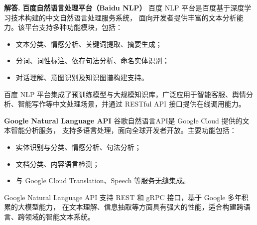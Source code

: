 \documentclass[12pt, a4paper, oneside]{ctexart}
\numberwithin{equation}{section}  %
\newenvironment{solution}[1][]{\par\noindent\textbf{#1解答. }}{\smallskip\par}  %
\begin{document}
\begin{solution}
\textbf{百度自然语言处理平台（Baidu NLP）}
百度 NLP 平台是百度基于深度学习技术构建的中文自然语言处理服务系统，
面向开发者提供丰富的文本分析能力。该平台支持多种功能模块，包括：
\begin{itemize}
  \item 文本分类、情感分析、关键词提取、摘要生成；
  \item 分词、词性标注、依存句法分析、命名实体识别；
  \item 对话理解、意图识别及知识图谱构建支持。
\end{itemize}
百度 NLP 平台集成了预训练模型与大规模知识库，广泛应用于智能客服、舆情分析、智能写作等中文处理场景，并通过 RESTful API 接口提供在线调用能力。

\textbf{Google Natural Language API}
谷歌自然语言API是 Google Cloud 提供的文本智能分析服务，
支持多语言处理，面向全球开发者开放。主要功能包括：
\begin{itemize}
  \item 实体识别与分类、情感分析、句法分析；
  \item 文档分类、内容语言检测；
  \item 与 Google Cloud Translation、Speech 等服务无缝集成。
\end{itemize}
Google Natural Language API 支持 REST 和 gRPC 接口，基于 Google 多年积累的大模型能力，
在文本理解、信息抽取等方面具有强大的性能，适合构建跨语言、跨领域的智能文本系统。
\end{solution}
\end{document}
